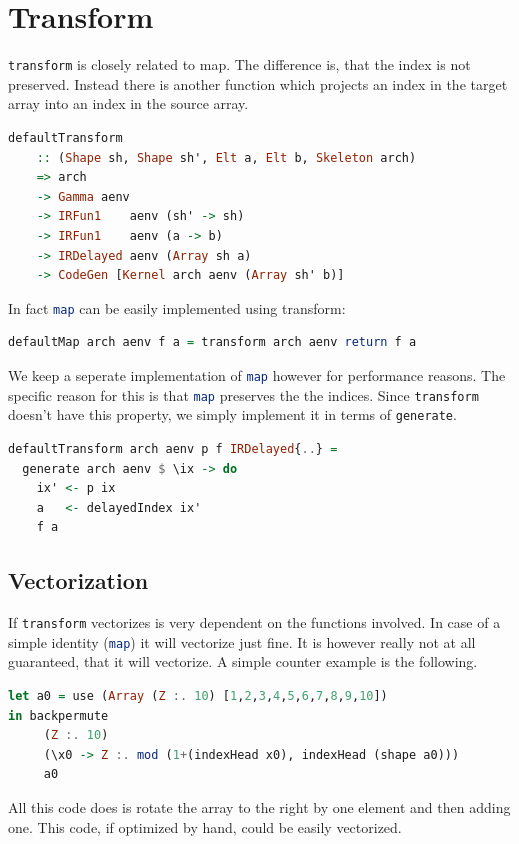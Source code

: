 \documentclass[a4paper,bibliography=totocnumbered,parskip,headsepline]{scrbook}
\begin{document}
\section{Transform}
\lstinline[language=haskell]!transform! is closely related to map.
The difference is, that the index is not preserved.
Instead there is another function which projects an index in the target array into an index in the source array.
\begin{lstlisting}[language=haskell]
defaultTransform
    :: (Shape sh, Shape sh', Elt a, Elt b, Skeleton arch)
    => arch
    -> Gamma aenv
    -> IRFun1    aenv (sh' -> sh)
    -> IRFun1    aenv (a -> b)
    -> IRDelayed aenv (Array sh a)
    -> CodeGen [Kernel arch aenv (Array sh' b)]
\end{lstlisting}
In fact \lstinline[language=haskell]!map! can be easily implemented using transform:
\begin{lstlisting}[language=haskell]
defaultMap arch aenv f a = transform arch aenv return f a
\end{lstlisting}
We keep a seperate implementation of \lstinline[language=haskell]!map! however for performance reasons.
The specific reason for this is that \lstinline[language=haskell]!map! preserves the the indices.
Since \lstinline[language=haskell]!transform! doesn't have this property, we simply implement it in terms of \lstinline[language=haskell]!generate!.
\begin{lstlisting}[language=haskell]
defaultTransform arch aenv p f IRDelayed{..} =
  generate arch aenv $ \ix -> do
    ix' <- p ix
    a   <- delayedIndex ix'
    f a
\end{lstlisting}

\subsection*{Vectorization}
If \lstinline[language=haskell]!transform! vectorizes is very dependent on the functions involved.
In case of a simple identity (\lstinline[language=haskell]!map!) it will vectorize just fine.
It is however really not at all guaranteed, that it will vectorize.
A simple counter example is the following.
\begin{lstlisting}[language=haskell]
let a0 = use (Array (Z :. 10) [1,2,3,4,5,6,7,8,9,10])
in backpermute
     (Z :. 10)
     (\x0 -> Z :. mod (1+(indexHead x0), indexHead (shape a0)))
     a0
\end{lstlisting}
All this code does is rotate the array to the right by one element and then adding one.
This code, if optimized by hand, could be easily vectorized.
\end{document}
